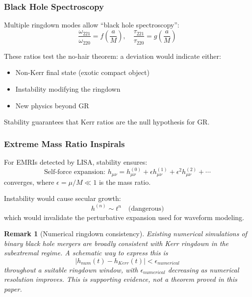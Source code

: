 \documentclass[12pt,a4paper]{article}
\newtheorem{remark}[theorem]{Remark}
\begin{document}
\subsubsection{Black Hole Spectroscopy}

Multiple ringdown modes allow ``black hole spectroscopy'':
\begin{equation}
\frac{\omega_{221}}{\omega_{220}} = f\left(\frac{a}{M}\right), \quad \frac{\tau_{221}}{\tau_{220}} = g\left(\frac{a}{M}\right)
\end{equation}

These ratios test the no-hair theorem: a deviation would indicate either:
\begin{itemize}
    \item Non-Kerr final state (exotic compact object)
    \item Instability modifying the ringdown
    \item New physics beyond GR
\end{itemize}

Stability guarantees that Kerr ratios are the null hypothesis for GR.

\subsubsection{Extreme Mass Ratio Inspirals}

For EMRIs detected by LISA, stability ensures:
\begin{equation}
\text{Self-force expansion: } h_{\mu\nu} = h_{\mu\nu}^{(0)} + \epsilon h_{\mu\nu}^{(1)} + \epsilon^2 h_{\mu\nu}^{(2)} + \cdots
\end{equation}
converges, where $\epsilon = \mu/M \ll 1$ is the mass ratio.

Instability would cause secular growth:
\begin{equation}
h^{(n)} \sim t^n \quad \text{(dangerous)}
\end{equation}
which would invalidate the perturbative expansion used for waveform modeling.

\begin{remark}[Numerical ringdown consistency]
Existing numerical simulations of binary black hole mergers are broadly consistent with Kerr ringdown in the subextremal regime. A schematic way to express this is
\begin{equation}
|h_{num}(t) - h_{Kerr}(t)| < \epsilon_{numerical}
\end{equation}
throughout a suitable ringdown window, with $\epsilon_{numerical}$ decreasing as numerical resolution improves. This is supporting evidence, not a theorem proved in this paper.
\end{remark}
\end{document}
